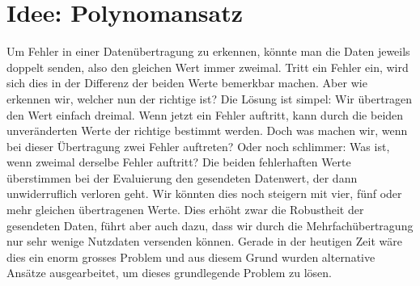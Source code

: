 %
%
\section{Idee: Polynomansatz
\label{reedsolomon:section:idee}}
Um Fehler in einer Datenübertragung zu erkennen, könnte man die Daten jeweils doppelt senden,
also den gleichen Wert immer zweimal. 
Tritt ein Fehler ein, wird sich dies in der Differenz der beiden Werte bemerkbar machen.
Aber wie erkennen wir, welcher nun der richtige ist? Die Lösung ist simpel: Wir übertragen den Wert einfach dreimal.
Wenn jetzt ein Fehler auftritt, kann durch die beiden unveränderten Werte der richtige bestimmt werden.
Doch was machen wir, wenn bei dieser Übertragung zwei Fehler auftreten? 
Oder noch schlimmer: Was ist, wenn zweimal derselbe Fehler auftritt? Die beiden fehlerhaften Werte überstimmen bei der Evaluierung den gesendeten Datenwert, der dann unwiderruflich verloren geht. 
Wir könnten dies noch steigern mit vier, fünf oder mehr gleichen übertragenen Werte. Dies erhöht zwar die Robustheit der gesendeten Daten, führt aber auch dazu, dass wir durch die Mehrfachübertragung nur sehr wenige Nutzdaten versenden können.
Gerade in der heutigen Zeit wäre dies ein enorm grosses Problem und aus diesem Grund wurden alternative Ansätze ausgearbeitet, um dieses grundlegende Problem zu lösen. 
%
%
%
%
%
%
%
%
%
%
% 
%
%
%
%
%
